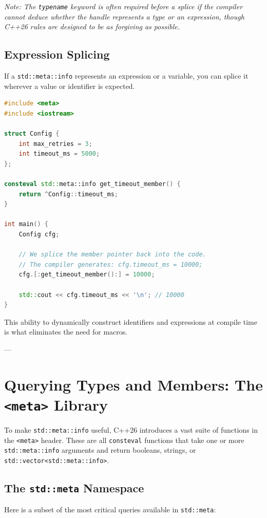 \textit{Note: The \texttt{typename} keyword is often required before a splice if the compiler cannot deduce whether the handle represents a type or an expression, though C++26 rules are designed to be as forgiving as possible.}

\subsection{Expression Splicing}

If a \texttt{std::meta::info} represents an expression or a variable, you can splice it wherever a value or identifier is expected.

\begin{lstlisting}[language=C++]
#include <meta>
#include <iostream>

struct Config {
    int max_retries = 3;
    int timeout_ms = 5000;
};

consteval std::meta::info get_timeout_member() {
    return ^Config::timeout_ms;
}

int main() {
    Config cfg;
    
    // We splice the member pointer back into the code.
    // The compiler generates: cfg.timeout_ms = 10000;
    cfg.[:get_timeout_member():] = 10000;
    
    std::cout << cfg.timeout_ms << '\n'; // 10000
}
\end{lstlisting}

This ability to dynamically construct identifiers and expressions at compile time is what eliminates the need for macros.

---

\section{Querying Types and Members: The \texttt{<meta>} Library}

To make \texttt{std::meta::info} useful, C++26 introduces a vast suite of functions in the \texttt{<meta>} header. These are all \texttt{consteval} functions that take one or more \texttt{std::meta::info} arguments and return booleans, strings, or \texttt{std::vector<std::meta::info>}.

\subsection{The \texttt{std::meta} Namespace}

Here is a subset of the most critical queries available in \texttt{std::meta}:

